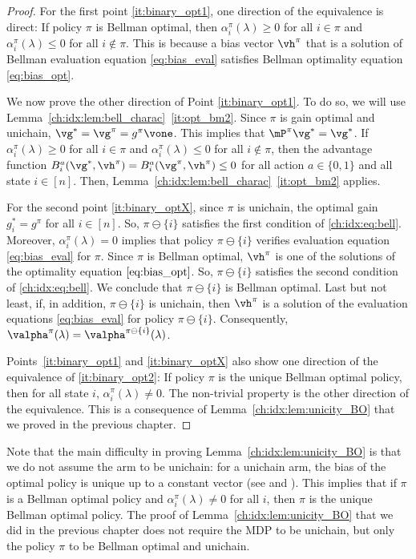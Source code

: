 \begin{proof}
    For the first point \ref{it:binary_opt1}, one direction of the equivalence is direct: If policy $\pi$ is Bellman optimal, then $\alpha^\pi_i(\lambda)\ge0$ for all $i\in\pi$ and $\alpha^\pi_i(\lambda)\le0$ for all $i\notin\pi$.
    This is because a bias vector $\vh^\pi$ that is a solution of Bellman evaluation equation \eqref{eq:bias_eval} satisfies Bellman optimality equation \eqref{eq:bias_opt}.

    We now prove the other direction of Point \ref{it:binary_opt1}.
    To do so, we will use Lemma~\ref{ch:idx:lem:bell_charac}~\ref{it:opt_bm2}.
    Since $\pi$ is gain optimal and unichain, $\vg^*=\vg^\pi=g^{\pi}\vone$.
    This implies that $\mP^\pi\vg^*=\vg^*$.
    If $\alpha^\pi_i(\lambda)\ge0$ for all $i\in\pi$ and $\alpha^\pi_i(\lambda)\le0$ for all $i\notin\pi$, then the advantage function $B^a_i(\vg^*, \vh^\pi)=B^a_i(\vg^\pi, \vh^\pi)\le 0$ for all action $a\in\{0,1\}$ and all state $i\in[n]$.
    Then, Lemma~\ref{ch:idx:lem:bell_charac}~\ref{it:opt_bm2} applies.

    For the second point \ref{it:binary_optX}, since $\pi$ is unichain, the optimal gain $g^*_i=g^\pi$ for all $i\in[n]$.
    So, $\pi\ominus\{i\}$ satisfies the first condition of \eqref{ch:idx:eq:bell}.
    Moreover, $\alpha^\pi_i(\lambda)=0$ implies that policy $\pi\ominus\{i\}$ verifies  evaluation equation \eqref{eq:bias_eval} for $\pi$.
    Since $\pi$ is Bellman optimal, $\vh^\pi$ is one of the solutions of the optimality equation $\eqref{eq:bias_opt}$.
    So, $\pi\ominus\{i\}$ satisfies the second condition of \eqref{ch:idx:eq:bell}.
    We conclude that $\pi\ominus\{i\}$ is Bellman optimal.
    Last but not least, if, in addition, $\pi\ominus\{i\}$ is unichain, then $\vh^\pi$ is a solution of the evaluation equations \eqref{eq:bias_eval} for policy $\pi\ominus\{i\}$. Consequently, $\valpha^\pi(\lambda)=\valpha^{\pi\ominus\{i\}}(\lambda)$.
    
    Points~\ref{it:binary_opt1} and \ref{it:binary_optX} also show one direction of the equivalence of \ref{it:binary_opt2}: If policy $\pi$ is the unique Bellman optimal policy, then for all state $i$, $\alpha^\pi_i(\lambda)\ne0$. The non-trivial property is the other direction of the equivalence. This is a consequence of Lemma~\ref{ch:idx:lem:unicity_BO} that we proved in the previous chapter.
\end{proof}

Note that the main difficulty in proving Lemma~\ref{ch:idx:lem:unicity_BO} is that we do not assume the arm to be unichain: for a unichain arm, the bias of the optimal policy is unique up to a constant vector (see \cite{schweitzer1978functional} and \cite[Section 8.4]{puterman2014markov}).
This implies that if $\pi$ is a Bellman optimal policy and $\alpha^\pi_i(\lambda)\ne0$ for all $i$, then $\pi$ is the unique Bellman optimal policy.
The proof of Lemma~\ref{ch:idx:lem:unicity_BO} that we did in the previous chapter does not require the MDP to be unichain, but only the policy $\pi$ to be Bellman optimal and unichain.

